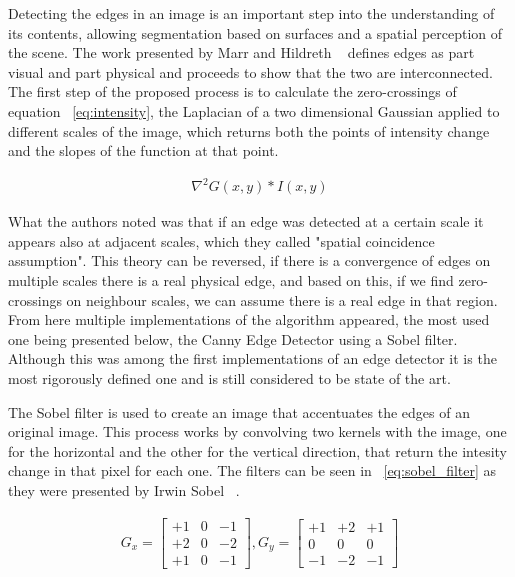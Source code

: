 Detecting the edges in an image is an important step into the understanding of its contents, allowing segmentation based on surfaces and a spatial perception of the scene. The work presented by Marr and Hildreth ~\cite{Marr1980TheoryOE} defines edges as part visual and part physical and proceeds to show that the two are interconnected. The first step of the proposed process is to calculate the zero-crossings of equation ~\ref{eq:intensity}, the Laplacian of a two dimensional Gaussian applied to different scales of the image, which returns both the points of intensity change and the slopes of the function at that point.

\begin{eqnarray}
\label{eq:intensity}
\nabla^{2} G(x,y)*I(x,y)
\end{eqnarray}

What the authors noted was that if an edge was detected at a certain scale it appears also at adjacent scales, which they called "spatial coincidence assumption". This theory can be reversed, if there is a convergence of edges on multiple scales there is a real physical edge, and based on this, if we find zero-crossings on neighbour scales, we can assume there is a real edge in that region. From here multiple implementations of the algorithm appeared, the most used one being presented below, the Canny Edge Detector using a Sobel filter. Although this was among the first implementations of an edge detector it is the most rigorously defined one and is still considered to be state of the art.

The Sobel filter is used to create an image that accentuates the edges of an original image. This process works by convolving two kernels with the image, one for the horizontal and the other for the vertical direction, that return the intesity change in that pixel for each one. The filters can be seen in ~\ref{eq:sobel_filter} as they were presented by Irwin Sobel ~\cite{sobel_isotropic_1989}.

\begin{eqnarray}
\label{eq:sobel_filter}
G_{x} =
\begin{bmatrix}
+1 & 0 & -1\\ 
+2 & 0 & -2\\ 
+1 & 0 & -1
\end{bmatrix} , G_{y} = \begin{bmatrix}
+1 & +2 & +1\\ 
0 & 0 & 0\\ 
-1 & -2 & -1
\end{bmatrix}
\end{eqnarray}

